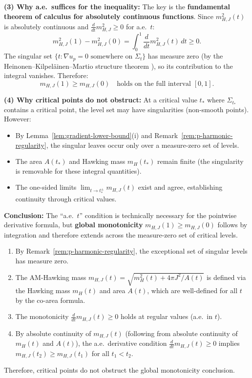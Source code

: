 \begin{remark}
\begin{remark}
\textbf{(3) Why a.e.\ suffices for the inequality:}
The key is the \textbf{fundamental theorem of calculus for absolutely continuous functions}. Since $m_{H,J}^2(t)$ is absolutely continuous and $\frac{d}{dt}m_{H,J}^2 \geq 0$ for a.e.\ $t$:
\[
m_{H,J}^2(1) - m_{H,J}^2(0) = \int_0^1 \frac{d}{dt}m_{H,J}^2(t)\, dt \geq 0.
\]
The singular set $\{t : \nabla u_p = 0 \text{ somewhere on } \Sigma_t\}$ has measure zero (by the Heinonen--Kilpel\"ainen--Martio structure theorem \cite{heinonen1993}), so its contribution to the integral vanishes. Therefore:
\[
m_{H,J}(1) \geq m_{H,J}(0) \quad \text{holds on the full interval } [0,1].
\]

\textbf{(4) Why critical points do not obstruct:}
At a critical value $t_*$ where $\Sigma_{t_*}$ contains a critical point, the level set may have singularities (non-smooth points). However:
\begin{itemize}
    \item By Lemma~\ref{lem:gradient-lower-bound}(i) and Remark~\ref{rem:p-harmonic-regularity}, the singular leaves occur only over a measure-zero set of levels.
    \item The area $A(t_*)$ and Hawking mass $m_H(t_*)$ remain finite (the singularity is removable for these integral quantities).
    \item The one-sided limits $\lim_{t \to t_*^\pm} m_{H,J}(t)$ exist and agree, establishing continuity through critical values.
\end{itemize}

\textbf{Conclusion:} The ``a.e.\ $t$'' condition is technically necessary for the pointwise derivative formula, but \textbf{global monotonicity} $m_{H,J}(1) \geq m_{H,J}(0)$ follows by integration and therefore extends across the measure-zero set of critical levels.
\end{remark}

\begin{remark}\label{rem:critical-detailed}
\begin{enumerate}
    \item By Remark~\ref{rem:p-harmonic-regularity}, the exceptional set of singular levels has measure zero.
    \item The AM-Hawking mass $m_{H,J}(t) = \sqrt{m_H^2(t) + 4\pi J^2/A(t)}$ is defined via the Hawking mass $m_H(t)$ and area $A(t)$, which are well-defined for all $t$ by the co-area formula.
    \item The monotonicity $\frac{d}{dt} m_{H,J}(t) \geq 0$ holds at regular values (a.e.\ in $t$).
    \item By absolute continuity of $m_{H,J}(t)$ (following from absolute continuity of $m_H(t)$ and $A(t)$), the a.e.\ derivative condition $\frac{d}{dt} m_{H,J}(t) \geq 0$ implies $m_{H,J}(t_2) \geq m_{H,J}(t_1)$ for all $t_1 < t_2$.
\end{enumerate}
Therefore, critical points do not obstruct the global monotonicity conclusion.
\end{remark}


\end{remark}
